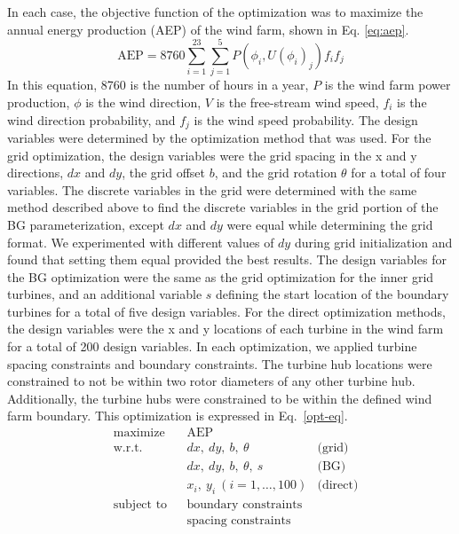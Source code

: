 \documentclass[wes, manuscript]{copernicus}
\begin{document}
In each case, the objective function of the optimization was to maximize the annual energy production (AEP) of the wind farm, shown in Eq. \ref{eq:aep}. 
%
\begin{equation}
\text{AEP} = 8760 \sum_{i=1}^{23}\sum_{j=1}^5P(\phi_i,U(\phi_i)_j)f_if_j
\label{eq:aep}
\end{equation}
%
In this equation, 8760 is the number of hours in a year, $P$ is the wind farm power production, $\phi$ is the wind direction, $V$ is the free-stream wind speed, $f_i$ is the wind direction probability, and $f_j$ is the wind speed probability.
%
The design variables were determined by the optimization method that was used. For the grid optimization, the design variables were the grid spacing in the x and y directions, $dx$ and $dy$, the grid offset $b$, and the grid rotation $\theta$ for a total of four variables. The discrete variables in the grid were determined with the same method described above to find the discrete variables in the grid portion of the BG parameterization, except $dx$ and $dy$ were equal while determining the grid format. We experimented with different values of $dy$ during grid initialization and found that setting them equal provided the best results. The design variables for the BG optimization were the same as the grid optimization for the inner grid turbines, and an additional variable $s$ defining the start location of the boundary turbines for a total of five design variables. For the direct optimization methods, the design variables were the x and y locations of each turbine in the wind farm for a total of 200 design variables.
%
In each optimization, we applied turbine spacing constraints and boundary constraints. The turbine hub locations were constrained to not be within two rotor diameters of any other turbine hub. Additionally, the turbine hubs were constrained to be within the defined wind farm boundary. This optimization is expressed in Eq.~\ref{opt-eq}.
%
\begin{equation}
			\begin{aligned}
				& \text{maximize}
					& & \text{AEP} \\
                & \text{w.r.t.} 
                 && dx,~ dy,~b,~ \theta
                 & \text{(grid)}\\
                 &&& dx,~ dy,~b,~ \theta,~ s
                 & \text{(BG)}\\
                	&&& x_i,~ y_i ~ (i = 1, \ldots, 100)
		& \text{(direct)}\\
				& \text{subject to}
					& & \text{boundary constraints} \\
						&&& \text{spacing constraints} \\
			\end{aligned}
		\label{opt-eq}
		\end{equation}
\end{document}
